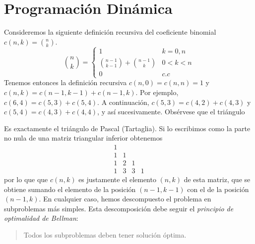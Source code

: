 \documentclass[AL.tex]{subfiles}
\begin{document}
\section{Programación Dinámica}

Consideremos la siguiente definición recursiva del coeficiente binomial $c(n,k)=\binom{n}{k}$.
\[
\binom{n}{k}=\begin{cases}
1 & k=0,n\\
\binom{n-1}{k-1}+\binom{n-1}{k} &0<k<n\\
0 & c.c
\end{cases}
\]
Tenemos entonces la definición recursiva $c(n,0)=c(n,n)=1$ y $c(n,k)=c(n-1,k-1)+c(n-1,k)$. Por ejemplo, $c(6,4)=c(5,3)+c(5,4)$. A continuación, $c(5,3)=c(4,2)+c(4,3)$ y $c(5,4)=c(4,3)+c(4,4)$, y así sucesivamente. Obsérvese que el triángulo 
\begin{center}
\end{center}

Es exactamente el triángulo de Pascal (Tartaglia). Si lo escribimos como la parte no nula de una matriz triangular inferior obtenemos
\[
\begin{matrix}
1 &   &   & \\
1 & 1 &   & \\
1 & 2 & 1 & \\
1 & 3 & 3 & 1
\end{matrix}
\]
por lo que que $c(n,k)$ es justamente el elemento $(n,k)$ de esta matriz, que se obtiene sumando el elemento de la posición $(n-1,k-1)$ con el de la posición $(n-1,k)$. En cualquier caso, hemos descompuesto el problema en subproblemas más simples. Esta descomposición debe seguir el \emph{principio de optimalidad de Bellman}:

\begin{verse}
Todos los subproblemas deben tener solución óptima.

\end{verse} 
\end{document}

